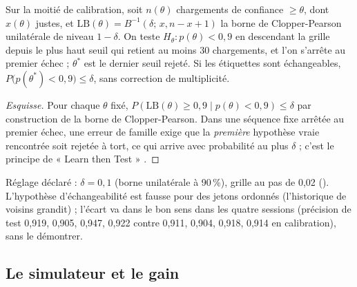 \begin{proposition}\label{t3mim:prop:conforme}
Sur la moitié de calibration, soit $n(\theta)$ chargements de confiance $\ge \theta$, dont $x(\theta)$ justes, et $\mathrm{LB}(\theta) = B^{-1}(\delta;\, x, n - x + 1)$ la borne de Clopper-Pearson unilatérale \cite{clopper1934} de niveau $1 - \delta$. On teste $H_\theta : p(\theta) < 0{,}9$ en descendant la grille depuis le plus haut seuil qui retient au moins 30 chargements, et l'on s'arrête au premier échec ; $\theta^\ast$ est le dernier seuil rejeté. Si les étiquettes sont échangeables, $P\bigl(p(\theta^\ast) < 0{,}9\bigr) \le \delta$, sans correction de multiplicité.
\end{proposition}
\begin{proof}[Esquisse]
Pour chaque $\theta$ fixé, $P(\mathrm{LB}(\theta) \ge 0{,}9 \mid p(\theta) < 0{,}9) \le \delta$ par construction de la borne de Clopper-Pearson. Dans une séquence fixe arrêtée au premier échec, une erreur de famille exige que la \emph{première} hypothèse vraie rencontrée soit rejetée à tort, ce qui arrive avec probabilité au plus $\delta$ ; c'est le principe de « Learn then Test » \cite{angelopoulos2021ltt}.
\end{proof}
Réglage déclaré : $\delta = 0{,}1$ (borne unilatérale à 90\,\%), grille au pas de 0,02 (). L'hypothèse d'échangeabilité est fausse pour des jetons ordonnés (l'historique de voisins grandit) ; l'écart va dans le bon sens dans les quatre sessions (précision de test 0,919, 0,905, 0,947, 0,922 contre 0,911, 0,904, 0,918, 0,914 en calibration), sans le démontrer.

\subsection{Le simulateur et le gain}\label{t3mim:sec:p4-gain}

